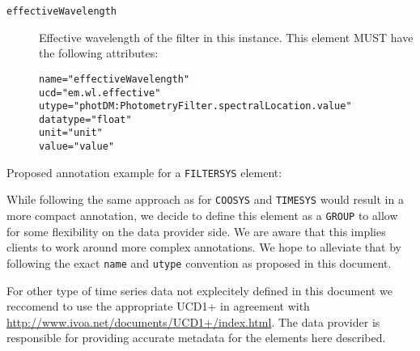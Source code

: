 \documentclass[11pt,a4paper]{ivoa}
\let\fg=\color
\def\attr#1{{\tt{\fg{DarkRed}#1}}}
\def\elem#1{{\tt{\fg{DarkRed}#1}}}
\def\attrval#1#2{{\tt{\fg{DarkRed}#1}="{\fg{DarkPurple}#2}"}}
\begin{document}
\begin{description}
\item[\elem{effectiveWavelength}] Effective wavelength of the filter in this instance. This element MUST have the following attributes:
\begin{description}
    \item[\attrval{name}{effectiveWavelength}]
    \item[\attrval{ucd}{em.wl.effective}]
    \item[\attrval{utype}{photDM:PhotometryFilter.spectralLocation.value}] 
    \item[\attrval{datatype}{float}]
    \item[\attrval{unit}{unit}]
    \item[\attrval{value}{value}]
\end{description}
\end{description}

%
 
Proposed annotation example for a \elem{FILTERSYS} element: 


While following the same approach as for \elem{COOSYS} and \elem{TIMESYS} would result in a more compact annotation, we decide to define this element as a \elem{GROUP} to allow for some flexibility on the data provider side. We are aware that this implies clients to work around more complex annotations. We hope to alleviate that by following the exact \attr{name} and \attr{utype} convention as proposed in this document. 

%

For other type of time series data not explecitely defined in this document we reccomend to use the appropriate UCD1+ in agreement with \url{http://www.ivoa.net/documents/UCD1+/index.html}. The data provider is responsible for providing accurate metadata for the elements here described.
\end{document}
